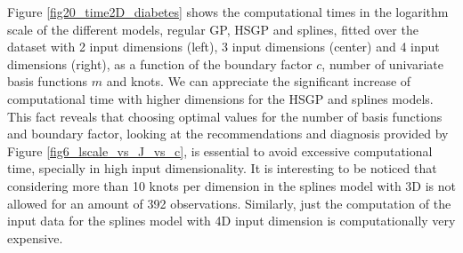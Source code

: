 \documentclass[]{interact}
\theoremstyle{plain}%
\theoremstyle{definition}
\theoremstyle{remark}
\begin{document}
Figure \ref{fig20_time2D_diabetes} shows the computational times in the logarithm scale of the different models, regular GP, HSGP and splines, fitted over the dataset with 2 input dimensions (left), 3 input dimensions (center) and 4 input dimensions (right), as a function of the boundary factor $c$, number of univariate basis functions $m$ and knots. We can appreciate the significant increase of computational time with higher dimensions for the HSGP and splines models. This fact reveals that choosing optimal values for the number of basis functions and boundary factor, looking at the recommendations and diagnosis provided by Figure \ref{fig6_lscale_vs_J_vs_c}, is essential to avoid excessive computational time, specially in high input dimensionality. It is interesting to be noticed that considering more than 10 knots per dimension in the splines model with 3D is not allowed for an amount of 392 observations. Similarly, just the computation of the input data for the splines model with 4D input dimension is computationally very expensive.

\end{document}
